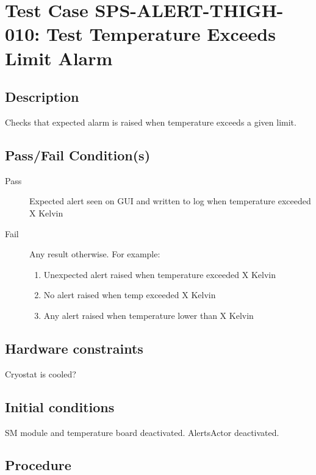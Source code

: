 \section{Test Case SPS-ALERT-THIGH-010: Test Temperature Exceeds Limit Alarm}

\subsection{Description}

Checks that expected alarm is raised when temperature exceeds a given limit.

\subsection{Pass/Fail Condition(s)}

\begin{description}
\item [Pass] Expected alert seen on GUI and written to log when temperature exceeded X Kelvin
\item [Fail] Any result otherwise. For example:

\begin{enumerate}
    \item Unexpected alert raised when temperature exceeded X Kelvin
    \item No alert raised when temp exceeded X Kelvin
    \item Any alert raised when temperature lower than X Kelvin
\end{enumerate}
\end{description}

\subsection{Hardware constraints}

Cryostat is cooled?

\subsection{Initial conditions}

SM module and temperature board deactivated. AlertsActor deactivated.

\subsection{Procedure}

